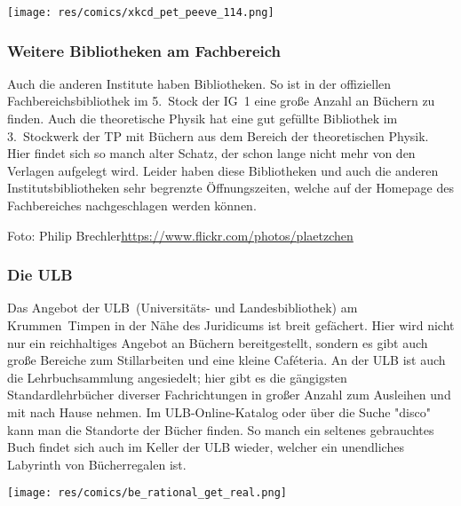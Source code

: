 \begin{multicols}{2}
\begin{center}
\texttt{[image: res/comics/xkcd\_pet\_peeve\_114.png]}
\end{center}

\subsubsection*{Weitere Bibliotheken am Fachbereich}
Auch die anderen Institute haben Bibliotheken. So ist in der offiziellen Fachbereichsbibliothek im 5.~Stock der IG~1 eine große Anzahl an Büchern zu finden. Auch die theoretische Physik hat eine gut gefüllte Bibliothek im 3.~Stockwerk der TP mit Büchern aus dem Bereich der theoretischen Physik. Hier findet sich so manch alter Schatz, der schon lange nicht mehr von den Verlagen aufgelegt wird. Leider haben diese Bibliotheken und auch die anderen Institutsbibliotheken sehr begrenzte Öffnungszeiten, welche auf der Homepage des Fachbereiches nachgeschlagen werden können.

{\scriptsize Foto: Philip Brechler\hfill\url{https://www.flickr.com/photos/plaetzchen}}

\subsubsection*{Die ULB}
Das Angebot der ULB~(Universitäts- und Landesbibliothek) am Krummen~Timpen in der Nähe des Juridicums ist breit gefächert. Hier wird nicht nur ein reichhaltiges Angebot an Büchern bereitgestellt, sondern es gibt auch große Bereiche zum Stillarbeiten und eine kleine Caféteria. An der ULB ist auch die Lehrbuchsammlung angesiedelt; hier gibt es die gängigsten Standardlehrbücher diverser Fachrichtungen in großer Anzahl zum Ausleihen und mit nach Hause nehmen. Im ULB-Online-Katalog oder über die Suche "disco" kann man die Standorte der Bücher finden. So manch ein seltenes gebrauchtes Buch findet sich auch im Keller der ULB wieder, welcher ein unendliches Labyrinth von Bücherregalen ist.

\texttt{[image: res/comics/be\_rational\_get\_real.png]}

\end{multicols}
